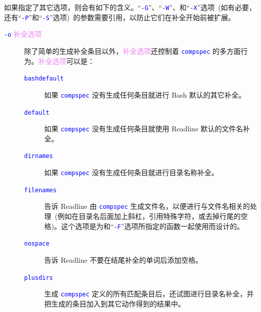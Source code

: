 \documentclass[openany,notitlepage]{book}
\newcommand{\code}[1]{\textcolor{blue}{{\tt #1}}}
\newcommand{\hs}[1]{{\textcolor{violet}{#1}}}
\begin{document}
\begin{CJK}{UTF8}{song}
如果指定了其它选项，则会有如下的含义。``\code{-G}''、``\code{-W}''、和``\code{-X}''选项~(如有必要，还有``\code{-P}''和``\code{-S}''选项)~的参数需要引用，以防止它们在补全开始前被扩展。
\begin{description}
\item[\code{-o} \hs{补全选项}]
除了简单的生成补全条目以外，\hs{补全选项}还控制着 \code{compspec} 的多方面行为。\hs{补全选项}可以是：
    \begin{description}
        \item[\code{bashdefault}] 如果 \code{compspec} 没有生成任何条目就进行 Bash 默认的其它补全。
        \item[\code{default}] 如果 \code{compspec} 没有生成任何条目就使用 Readline 默认的文件名补全。
        \item[\code{dirnames}] 如果 \code{compspec} 没有生成任何条目就进行目录名称补全。
        \item[\code{filenames}] 告诉 Readline 由 \code{compspec} 生成文件名，以便进行与文件名相关的处理~(例如在目录名后面加上斜杠，引用特殊字符，或去掉行尾的空格)。这个选项是为和``\code{-F}''选项所指定的函数一起使用而设计的。
        \item[\code{nospace}] 告诉 Readline 不要在结尾补全的单词后添加空格。
        \item[\code{plusdirs}] 生成 \code{compspec} 定义的所有匹配条目后，还试图进行目录名补全，并把生成的条目加入到其它动作得到的结果中。
    \end{description}


\end{description}
\end{CJK}
\end{document}
